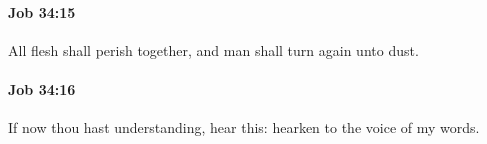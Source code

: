 		\paragraph{Job 34:15} %
			\label{JOB-34-15}

			All flesh shall perish together, and man shall turn again unto dust.


		\paragraph{Job 34:16} %
			\label{JOB-34-16}

			If now thou hast understanding, hear this: hearken to the voice of my words.


